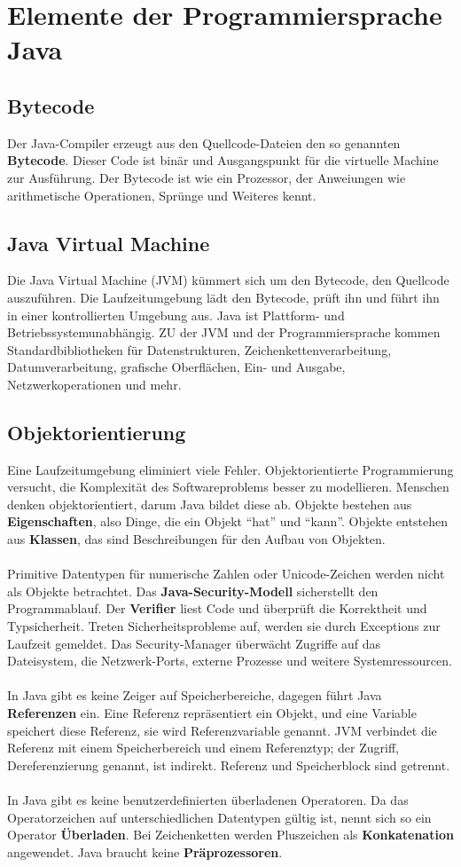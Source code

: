 \section{Elemente der Programmiersprache Java}
\subsection{Bytecode}
Der Java-Compiler erzeugt aus den Quellcode-Dateien den so genannten \textbf{Bytecode}. Dieser Code ist binär und Ausgangspunkt für die virtuelle Machine zur Ausführung. Der Bytecode ist wie ein Prozessor, der Anweiungen wie arithmetische Operationen, Sprünge und Weiteres kennt.
\subsection{Java Virtual Machine}
Die Java Virtual Machine (JVM) kümmert sich um den Bytecode, den Quellcode auszuführen. Die Laufzeitumgebung lädt den Bytecode, prüft ihn und führt ihn in einer kontrollierten Umgebung aus. Java ist Plattform- und Betriebssystemunabhängig. ZU der JVM und der Programmiersprache kommen Standardbibliotheken für Datenstrukturen, Zeichenkettenverarbeitung, Datumverarbeitung, grafische Oberflächen, Ein- und Ausgabe, Netzwerkoperationen und mehr.
\subsection{Objektorientierung}
Eine Laufzeitumgebung eliminiert viele Fehler. Objektorientierte Programmierung versucht, die Komplexität des Softwareproblems besser zu modellieren. Menschen denken objektorientiert, darum Java bildet diese ab. Objekte bestehen aus \textbf{Eigenschaften}, also Dinge, die ein Objekt ``hat'' und ``kann''. Objekte entstehen aus \textbf{Klassen}, das sind Beschreibungen für den Aufbau von Objekten.
\\\\
Primitive Datentypen für numerische Zahlen oder Unicode-Zeichen werden nicht als Objekte betrachtet. Das \textbf{Java-Security-Modell} sicherstellt den Programmablauf. Der \textbf{Verifier} liest Code und überprüft die Korrektheit und Typsicherheit. Treten Sicherheitsprobleme auf, werden sie durch Exceptions zur Laufzeit gemeldet. Das Security-Manager überwächt Zugriffe auf das Dateisystem, die Netzwerk-Ports, externe Prozesse und weitere Systemressourcen.
\\\\
In Java gibt es keine Zeiger auf Speicherbereiche, dagegen führt Java \textbf{Referenzen} ein. Eine Referenz repräsentiert ein Objekt, und eine Variable speichert diese Referenz, sie wird Referenzvariable genannt. JVM verbindet die Referenz mit einem Speicherbereich und einem Referenztyp; der Zugriff, Dereferenzierung genannt, ist indirekt. Referenz und Speicherblock sind getrennt.
\\\\
In Java gibt es keine benutzerdefinierten überladenen Operatoren. Da das Operatorzeichen auf unterschiedlichen Datentypen gültig ist, nennt sich so ein Operator \textbf{Überladen}. Bei Zeichenketten werden Pluszeichen als \textbf{Konkatenation} angewendet. Java braucht keine \textbf{Präprozessoren}.
